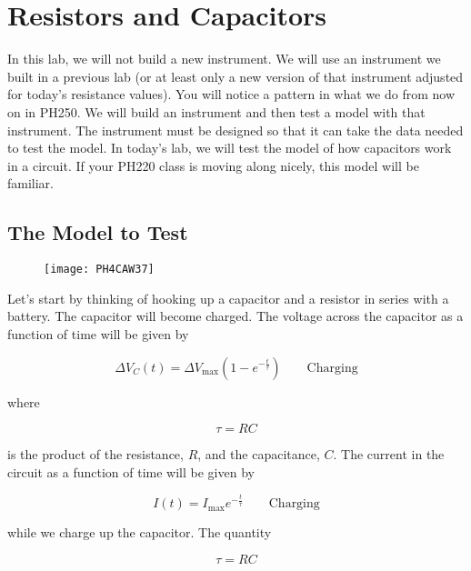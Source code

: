 \chapter{Resistors and Capacitors}
In this lab, we will not build a new instrument. We will use an instrument we built in a previous lab (or at least only a new version of that instrument adjusted for today's resistance values). You will notice a pattern in what we do from now on in PH250. We will build an instrument and then test a model with that instrument. The instrument must be designed so that it can take the data needed to test the model. In today's lab, we will test the model of how capacitors work in a circuit. If your PH220 class is
moving along nicely, this model will be familiar.

\section{The Model to Test}

\begin{figure}[h!]
	\centering
	\texttt{[image: PH4CAW37]}
\end{figure}

Let's start by thinking of hooking up a capacitor and a resistor in series with a battery. The capacitor will become charged. The voltage across the capacitor as a function of time will be given by

\begin{equation*}
	\Delta V_{C}\left( t\right) =\Delta V_{\max }\left( 1-e^{-\frac{t}{\tau } }\right) \qquad \text{Charging}
	\label{charging}
\end{equation*}

\noindent where 

\begin{equation}
	\tau =RC
\end{equation}

\noindent is the product of the resistance, $R$, and the capacitance, $C.$ The current in the circuit as a function of time will be given by 

\begin{equation*}
	I\left( t\right) =I_{\max }e^{-\frac{t}{\tau }}\qquad \text{Charging}
\end{equation*}

\noindent while we charge up the capacitor. The quantity 

\begin{equation*}
	\tau =RC
\end{equation*}

